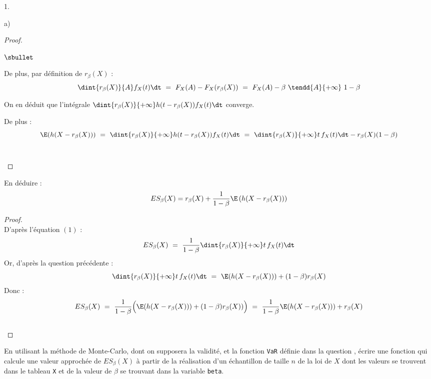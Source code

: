 \documentclass[11pt]{article}%
\begin{document}
\begin{noliste}{1.}
\begin{noliste}{a)}
\begin{proof}
\begin{noliste}{$\sbullet$}
	\item De plus, par définition de $r_\beta(X)$ :
	\[
	  \dint{r_\beta(X)}{A} f_X(t) \dt \ = \ F_X(A) - F_X(r_\beta(X))
	  \ = \ F_X(A) - \beta \ \tendd{A}{+\infty} \ 1-\beta
	\]
	
	\item On en déduit que l'intégrale $\dint{r_\beta(X)}{+\infty}
	h(t-r_\beta(X)) f_X(t) \dt$ converge.
	
	De plus :
	\[
	  \E(h(X-r_\beta(X))) \ = \
	  \dint{r_\beta(X)}{+\infty} h(t- r_\beta(X)) f_X(t) \dt 
	  \ = \ \dint{r_\beta(X)}{+\infty} t \, f_X(t) \dt - 
	  r_\beta(X) (1-\beta)
	\]
	~\\[-1.4cm]
      \end{noliste}
    \end{proof}

    
    \item En déduire : 
    \[
      ES_\beta(X)=r_\beta(X)+\dfrac{1}{1-\beta} 
      \E\left(h(X-r_\beta(X))\right)
    \]
    
    \begin{proof}~\\
      D'après l'équation $(1)$ :
      \[
        ES_\beta(X) \ = \ \dfrac{1}{1-\beta} \dint{r_\beta(X)}{+\infty}
        t \, f_X(t) \dt
      \]
      Or, d'après la question précédente :
      \[
        \dint{r_\beta(X)}{+\infty} t \, f_X(t) \dt \ = \ 
        \E(h(X- r_\beta(X))) + (1-\beta) r_\beta(X)
      \]
      Donc : 
      \[
        ES_\beta(X) \ = \ \dfrac{1}{1-\beta} \Big(
        \E(h(X- r_\beta(X))) + (1-\beta) r_\beta(X)) \Big) \ = \
        \dfrac{1}{1-\beta} \E(h(X- r_\beta(X))) + r_\beta(X)
      \]
      \conc{$ES_\beta(X) \ = \ r_\beta(X) + \dfrac{1}{1-\beta} 
      \E(h(X- r_\beta(X)))$}~\\[-1cm]
    \end{proof}
  \end{noliste}
  
  
  
  \newpage
  
  
  
  \item En utilisant la méthode de Monte-Carlo, dont on supposera 
  la validité, et la fonction {\tt VaR} définie dans la question 
  , écrire une fonction \Scilab{} qui calcule une valeur 
  approchée de $ES_\beta(X)$ à partir de la réalisation d'un 
  échantillon de taille $n$ de la loi de $X$ dont les valeurs se 
  trouvent dans le tableau \Scilab{} {\tt X} et de la valeur de 
  $\beta$ se trouvant dans la variable \Scilab{} {\tt beta}.
  

\end{noliste}
\end{document}

